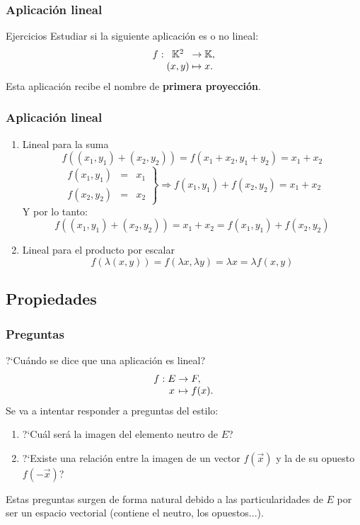 \documentclass{beamer}
\begin{document}
\begin{frame}
  \frametitle{Aplicaci\'on lineal}
 \begin{block}{Ejercicios} 
Estudiar si la siguiente aplicaci\'on es o no lineal:
  \[
  \begin{array}{@{}r@{\;}c@{\;}c@{\;}l@{}}
    f: & \mathbb K^2 & \rightarrow & \mathbb K,   \\
       & (x,y) & \mapsto     & x.
  \end{array}
\]
Esta aplicaci\'on recibe el nombre de \textbf{primera proyecci\'on}.
\end{block}

\end{frame}


\begin{frame}
  \frametitle{Aplicaci\'on lineal}
  \begin{enumerate}
  \item Lineal para la suma
\[f((x_1, y_1)+(x_2,y_2)) = f(x_1+x_2, y_1+y_2) = x_1+x_2\]
\[\left.\begin{array}{ccc}f(x_1,y_1) & = & x_1 \\f(x_2,y_2) & =  & x_2\end{array}\right\} \Rightarrow f(x_1,y_1)+f(x_2,y_2) = x_1+x_2\]
Y por lo tanto:
\[f((x_1, y_1)+(x_2,y_2)) = x_1+x_2 = f(x_1,y_1)+f(x_2,y_2)\]

\item Lineal para el producto por escalar
\[f(\lambda(x,y)) = f(\lambda x, \lambda y) = \lambda x = \lambda f(x,y)\]
\end{enumerate}
\end{frame}

\subsection{Propiedades}
\begin{frame}
  \frametitle{Preguntas}
?`Cu\'ando se dice que una aplicaci\'on es lineal? 
 \[
  \begin{array}{@{}r@{\;}c@{\;}c@{\;}l@{}}
    f: & E & \rightarrow & F,   \\
       & x & \mapsto     & f(x).
  \end{array}
\]
Se va a intentar responder a preguntas del estilo:
  \begin{enumerate}
  \item ?`Cu\'al ser\'a la imagen del elemento neutro de $E$? 
  \item ?`Existe una relaci\'on entre la imagen de un vector $f(\vec x)$ y la de su opuesto $f(-\vec x)$?  
\end{enumerate}
Estas preguntas surgen de forma natural debido a las particularidades de $E$ por ser un espacio vectorial (contiene el neutro, los opuestos...). 
\end{frame}
\end{document}
